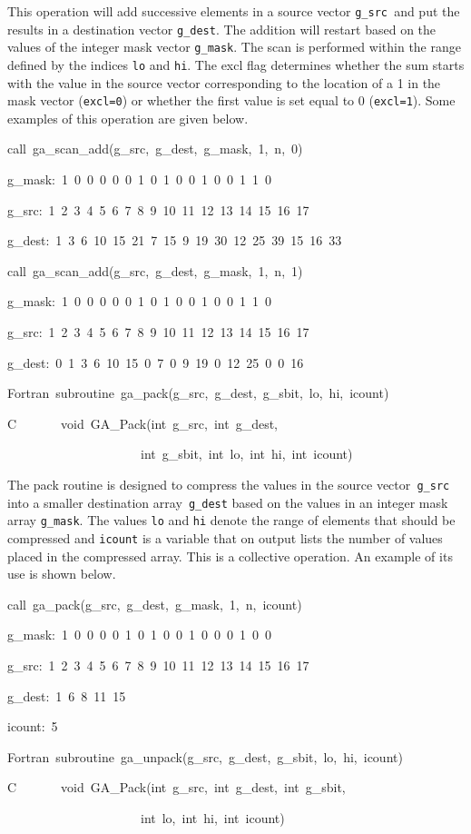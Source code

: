 This operation will add successive elements in a source vector \texttt{g\_src
}and put the results in a destination vector \texttt{g\_dest}. The
addition will restart based on the values of the integer mask vector
\texttt{g\_mask}. The scan is performed within the range defined by
the indices \texttt{lo} and \texttt{hi}. The excl flag determines
whether the sum starts with the value in the source vector corresponding
to the location of a 1 in the mask vector (\texttt{excl=0}) or whether
the first value is set equal to 0 (\texttt{excl=1}). Some examples
of this operation are given below.
\begin{lyxcode}
call~ga\_scan\_add(g\_src,~g\_dest,~g\_mask,~1,~n,~0)~

g\_mask:~1~0~0~0~0~0~1~0~1~0~0~1~0~0~1~1~0~

g\_src:~1~2~3~4~5~6~7~8~9~10~11~12~13~14~15~16~17~

g\_dest:~1~3~6~10~15~21~7~15~9~19~30~12~25~39~15~16~33



call~ga\_scan\_add(g\_src,~g\_dest,~g\_mask,~1,~n,~1)~

g\_mask:~1~0~0~0~0~0~1~0~1~0~0~1~0~0~1~1~0~

g\_src:~1~2~3~4~5~6~7~8~9~10~11~12~13~14~15~16~17~

g\_dest:~0~1~3~6~10~15~0~7~0~9~19~0~12~25~0~0~16



Fortran~subroutine~ga\_pack(g\_src,~g\_dest,~g\_sbit,~lo,~hi,~icount)~

C~~~~~~~void~GA\_Pack(int~g\_src,~int~g\_dest,~

~~~~~~~~~~~~~~~~~~~~~int~g\_sbit,~int~lo,~int~hi,~int~icount)
\end{lyxcode}
The pack routine is designed to compress the values in the source
vector\texttt{ g\_src} into a smaller destination array\texttt{ g\_dest}
based on the values in an integer mask array \texttt{g\_mask}. The
values \texttt{lo} and \texttt{hi} denote the range of elements that
should be compressed and \texttt{icount} is a variable that on output
lists the number of values placed in the compressed array. This is
a collective operation. An example of its use is shown below.
\begin{lyxcode}
call~ga\_pack(g\_src,~g\_dest,~g\_mask,~1,~n,~icount)~

g\_mask:~1~0~0~0~0~1~0~1~0~0~1~0~0~0~1~0~0~

g\_src:~1~2~3~4~5~6~7~8~9~10~11~12~13~14~15~16~17~

g\_dest:~1~6~8~11~15~

icount:~5



Fortran~subroutine~ga\_unpack(g\_src,~g\_dest,~g\_sbit,~lo,~hi,~icount)~

C~~~~~~~void~GA\_Pack(int~g\_src,~int~g\_dest,~int~g\_sbit,~

~~~~~~~~~~~~~~~~~~~~~int~lo,~int~hi,~int~icount)
\end{lyxcode}
